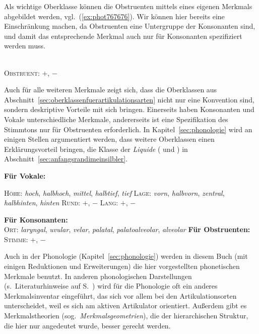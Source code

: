 \begin{exe}
\end{exe}

Als wichtige Oberklasse können die Obstruenten mittels eines eigenen Merkmals abgebildet werden, vgl.\ (\ref{ex:phot767676}).
Wir können hier bereits eine Einschränkung machen, da Obstruenten eine Untergruppe der Konsonanten sind, und damit das entsprechende Merkmal auch nur für Konsonanten spezifiziert werden muss.

\begin{exe}
	\\
		\textsc{Obstruent}: $+$, $-$
\end{exe}

Auch für alle weiteren Merkmale zeigt sich, dass die Oberklassen aus Abschnitt~\ref{sec:oberklassenfuerartikulationsarten} nicht nur eine Konvention sind, sondern deskriptive Vorteile mit sich bringen.
Einerseits haben Konsonanten und Vokale unterschiedliche Merkmale, andererseits ist eine Spezifikation des Stimmtons nur für Obstruenten erforderlich.
In Kapitel~\ref{sec:phonologie} wird an einigen Stellen argumentiert werden, dass weitere Oberklassen einen Erklärungsvorteil bringen, \zB die Klasse der \textit{Liquide} (\textipa{[K]} und \textipa{[l]}) in Abschnitt~\ref{sec:anfangsrandimeinsilbler}.

\begin{exe}
	\ex \textbf{Für Vokale:}
		\begin{xlist}
			\ex \textsc{Höhe}: \textit{hoch}, \textit{halbhoch}, \textit{mittel}, \textit{halbtief}, \textit{tief}
			\ex \textsc{Lage}: \textit{vorn}, \textit{halbvorn}, \textit{zentral}, \textit{halbhinten}, \textit{hinten}
			\ex \textsc{Rund}: $+$, $-$
			\ex \textsc{Lang}: $+$, $-$
		\end{xlist}
	\ex \textbf{Für Konsonanten:}\\
			\textsc{Ort}: \textit{laryngal}, \textit{uvular}, \textit{velar}, \textit{palatal}, \textit{palatoalveolar}, \textit{alveolar}
	\ex \textbf{Für Obstruenten:}\\
		\textsc{Stimme}: $+$, $-$
\end{exe}

Auch in der Phonologie (Kapitel~\ref{sec:phonologie}) werden in diesem Buch (mit einigen Reduktionen und Erweiterungen) die hier vorgestellten phonetischen Merkmale benutzt.
In anderen phonologischen Darstellungen (s.\ Literaturhinweise auf S.~\pageref{abs:pholliteratur}) wird für die Phonologie oft ein anderes Merkmalsinventar eingeführt, das sich vor allem bei den Artikulationsorten unterscheidet, weil es sich am aktiven Artikulator orientiert.
Außerdem gibt es Merkmalstheorien (sog.\ \textit{Merkmalsgeometrien}), die der hierarchischen Struktur, die hier nur angedeutet wurde, besser gerecht werden.


